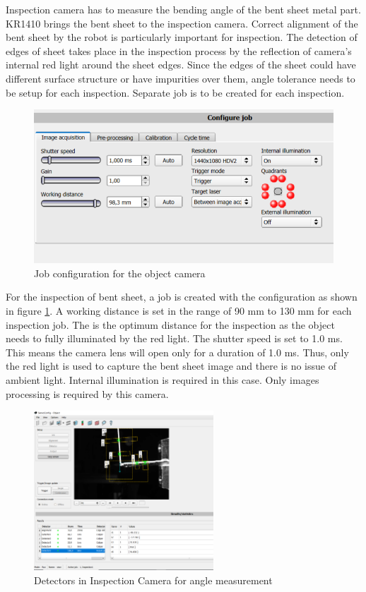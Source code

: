 Inspection camera has to measure the bending angle of the bent sheet metal part. KR1410 brings the bent sheet to the inspection camera. Correct alignment of the bent sheet by the robot is particularly important for inspection. The detection of edges of sheet takes place in the inspection process by the reflection of camera's internal red light around the sheet edges. Since the edges of the sheet could have different surface structure or have impurities over them, angle tolerance needs to be setup for each inspection. Separate job is to be created for each inspection.

\begin{figure}[h]
    \centering
    \includegraphics[width=\textwidth]{figures/job-configuration-object.png}
    \caption{Job configuration for the object camera}
    \label{fig:job-configuration-object}
\end{figure}

For the inspection of bent sheet, a job is created with the configuration as shown in figure \ref{fig:job-configuration-object}. A working distance is set in the range of 90 mm to 130 mm for each inspection job. The is the optimum distance for the inspection as the object needs to fully illuminated by the red light. The shutter speed is set to 1.0 ms. This means the camera lens will open only for a duration of 1.0 ms. Thus, only the red light is used to capture the bent sheet image and there is no issue of ambient light. Internal illumination is required in this case.
Only images processing is required by this camera.

\begin{figure}[h]
    \centering
    \includegraphics[width=0.6\textwidth]{figures/measurement-detector.png}
    \caption{Detectors in Inspection Camera for angle measurement}
    \label{fig:measurement-detector}
\end{figure}

